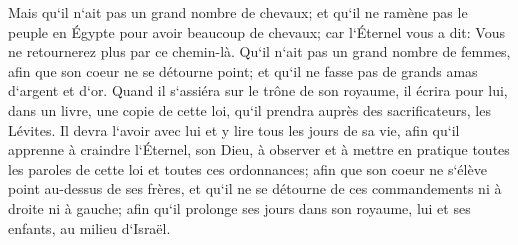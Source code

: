 \verse Mais qu`il n`ait pas un grand nombre de chevaux; et qu`il ne ramène pas le peuple en Égypte pour avoir beaucoup de chevaux; car l`Éternel vous a dit: Vous ne retournerez plus par ce chemin-là. 
\verse Qu`il n`ait pas un grand nombre de femmes, afin que son coeur ne se détourne point; et qu`il ne fasse pas de grands amas d`argent et d`or. 
\verse Quand il s`assiéra sur le trône de son royaume, il écrira pour lui, dans un livre, une copie de cette loi, qu`il prendra auprès des sacrificateurs, les Lévites. 
\verse Il devra l`avoir avec lui et y lire tous les jours de sa vie, afin qu`il apprenne à craindre l`Éternel, son Dieu, à observer et à mettre en pratique toutes les paroles de cette loi et toutes ces ordonnances; 
\verse afin que son coeur ne s`élève point au-dessus de ses frères, et qu`il ne se détourne de ces commandements ni à droite ni à gauche; afin qu`il prolonge ses jours dans son royaume, lui et ses enfants, au milieu d`Israël. 

\chapter{}

